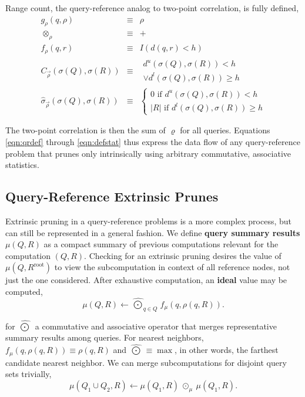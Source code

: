 \documentclass[twoside,leqno,twocolumn]{article}
\newcommand{\union}{\cup}
\newcommand{\summary}{\hat{\sigma}}
\newcommand{\defterm}[1]{{\bf #1}}
\newcommand{\kdroot}[1]{#1^{\text{root}}}
\newcommand{\lo}[1]{#1^{l}}
\newcommand{\up}[1]{#1^{u}}
\newcommand{\distlo}{\lo{d}}
\newcommand{\distup}{\up{d}}
\newcommand{\dist}[2]{d(#1,#2)}
\newcommand{\nameOp}[2]{\mathop{#1\nolimits\!\!_{#2}}}
\newcommand{\nameop}[2]{{\scriptstyle\:}#1_{\!#2}}
\newcommand{\myop}[1]{\nameop{\otimes}{#1}}
\newcommand{\letterqr}{\rho}
\newcommand{\outqr}{\varrho}
\newcommand{\inqr}{\rho}
\newcommand{\opqr}{\myop{\letterqr}}
\newcommand{\fqr}{f_{\!\letterqr}}
\newcommand{\gqr}{g_{\!\letterqr}}
\newcommand{\letterqrv}{\vec{\rho}}
\newcommand{\deltaqrv}{\summary_{\!\letterqrv}}
\newcommand{\canpruneqrv}{C_{\!\letterqrv}}
\newcommand{\lettermu}{\mu}
\newcommand{\inmu}{\mu}
\newcommand{\Outopmu}{\widehat{\nameOp{\bigodot}{\lettermu}}}%
\newcommand{\outopmu}{\:\widehat{\odot}_{\!\mu}\:}
\newcommand{\fmu}{f_{\!\lettermu}}
\newcommand{\outstat}{\sigma}
\begin{document}
\noindent
Range count, the query-reference analog to two-point correlation, is fully defined,
\begin{eqnarray*}
\gqr(q, \inqr) &\equiv& \inqr
\\
\opqr &\equiv& +
\\
\fqr(q,r) &\equiv& I(\dist{q}{r} < h)
\\
\canpruneqrv(\outstat(Q), \outstat(R))
&\equiv&
\begin{array}{l}\distup(\outstat(Q),\outstat(R)) < h \\ \vee \distlo(\outstat(Q),\outstat(R)) \geq h\end{array}
\\
\deltaqrv(\outstat(Q),\outstat(R)) &\equiv& \left\{ \begin{array}{l} 0 \text{ if } \distup(\outstat(Q),\outstat(R)) < h \\ |R| \text{ if } \distlo(\outstat(Q),\outstat(R)) \geq h \end{array}\right.
\end{eqnarray*}

\noindent
The two-point correlation is then the sum of $\outqr$ for all queries.
Equations \ref{eqn:qrdef} through \ref{eqn:defstat} thus express the data flow of any query-reference problem that prunes only intrinsically using arbitrary commutative, associative statistics.

\subsection{Query-Reference Extrinsic Prunes}

Extrinsic pruning in a query-reference problems is a more complex process, but can still be represented in a general fashion.
We define \defterm{query summary results} $\inmu(Q, R)$ as a compact summary of previous computations relevant for the computation $(Q,R)$.
Checking for an extrinsic pruning desires the value of $\inmu(Q, \kdroot{R})$ to view the subcomputation in context of all reference nodes, not just the one considered.
After exhaustive computation, an \defterm{ideal} value may be computed,
\begin{equation*}
\inmu(Q, R) \gets \Outopmu_{q \in Q} \fmu(q, \inqr(q, R)).
\end{equation*}

\noindent for $\Outopmu$ a commutative and associative operator that merges representative summary results among queries.
For nearest neighbors, $\fmu(q, \inqr(q, R)) \equiv \inqr(q, R)$ and $\Outopmu \equiv \max$, in other words, the farthest candidate nearest neighbor.
We can merge subcomputations for disjoint query sets trivially,
\begin{equation}
\inmu(Q_1 \union Q_2, R) \gets \inmu(Q_1, R) \outopmu \inmu(Q_1, R).
\label{eqn:muchild}
\end{equation}
\end{document}
